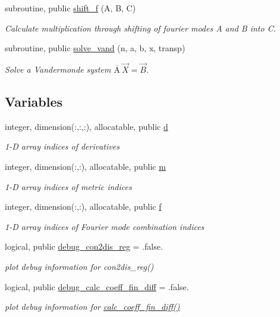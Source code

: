\begin{DoxyCompactItemize}
subroutine, public \hyperlink{namespacenum__utilities_a859f442a1b860d82662eed17c4374c38}{shift\+\_\+f} (A, B, C)
\begin{DoxyCompactList}\small\item\em Calculate multiplication through shifting of fourier modes A and B into C. \end{DoxyCompactList}\item 
subroutine, public \hyperlink{namespacenum__utilities_a54c65e345182e2e7e13ac14a0ba3647a}{solve\+\_\+vand} (n, a, b, x, transp)
\begin{DoxyCompactList}\small\item\em Solve a Vandermonde system $\overline{\text{A}} \ \vec{X} = \vec{B}$. \end{DoxyCompactList}\end{DoxyCompactItemize}
\subsection*{Variables}
\begin{DoxyCompactItemize}
\item 
integer, dimension(\+:,\+:,\+:), allocatable, public \hyperlink{namespacenum__utilities_a763215553acfcc054b1ec1bc207a1793}{d}
\begin{DoxyCompactList}\small\item\em 1-\/D array indices of derivatives \end{DoxyCompactList}\item 
integer, dimension(\+:,\+:), allocatable, public \hyperlink{namespacenum__utilities_ad7a7ae2abf02a2df9e00b2aca669617c}{m}
\begin{DoxyCompactList}\small\item\em 1-\/D array indices of metric indices \end{DoxyCompactList}\item 
integer, dimension(\+:,\+:), allocatable, public \hyperlink{namespacenum__utilities_a8e3399292fcb3a5fc35ae87f7811bbb5}{f}
\begin{DoxyCompactList}\small\item\em 1-\/D array indices of Fourier mode combination indices \end{DoxyCompactList}\item 
logical, public \hyperlink{namespacenum__utilities_ab7138a230a3c494c7a2b71b2a7fffc0a}{debug\+\_\+con2dis\+\_\+reg} = .false.
\begin{DoxyCompactList}\small\item\em plot debug information for con2dis\+\_\+reg() \end{DoxyCompactList}\item 
logical, public \hyperlink{namespacenum__utilities_ae20985c8049d39f987fa23d728688cbc}{debug\+\_\+calc\+\_\+coeff\+\_\+fin\+\_\+diff} = .false.
\begin{DoxyCompactList}\small\item\em plot debug information for \hyperlink{namespacenum__utilities_a4dffe3beba7165dd17cff19a99a9e2ac}{calc\+\_\+coeff\+\_\+fin\+\_\+diff()} \end{DoxyCompactList}\end{DoxyCompactItemize}


